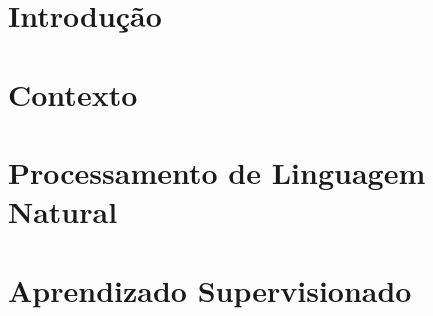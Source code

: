 \documentclass[a4paper,12pt,oneside,openany]{book}
\begin{document}
\frontmatter
\thispagestyle{empty}



\pagebreak



\tableofcontents
\listoffigures
\listoftables
\listofalgorithms

\mainmatter
\cleardoublepage
\chapter{Introdução}
\label{introducao}


\chapter{Contexto}
\label{contexto}


\chapter{Processamento de Linguagem Natural}
\label{nlp}


\chapter{Aprendizado Supervisionado}
\label{supervisionado}

\end{document}

